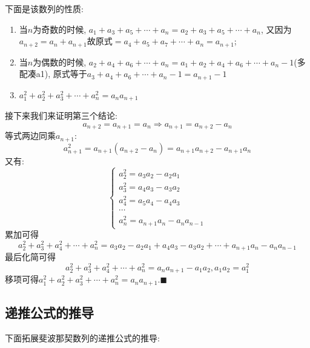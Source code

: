 \documentclass{book}
\begin{document}
    下面是该数列的性质:

    \begin{enumerate}
        \item 当$n$为奇数的时候, $a_1+a_3+a_5+\cdots+a_n=a_2+a_3+a_5+\cdots+a_n$, 又因为$a_{n+2}=a_n+a_{n+1}$故原式$=a_4+a_5+a_7+\cdots+a_n=a_{n+1}$;
        \item 当$n$为偶数的时候, $a_2+a_4+a_6+\cdots+a_n=a_1+a_2+a_4+a_6+\cdots+a_n-1$(多配凑a1), 原式等于$a_3+a_4+a_6+\cdots+a_n-1=a_{n+1}-1$
        \item $\displaystyle a_1^2+a_2^2+a_3^2+\cdots+a_n^2=a_na_{n+1}$
    \end{enumerate}

    接下来我们来证明第三个结论:
    $$a_{n+2}=a_{n+1}=a_n\Longrightarrow a_{n+1}=a_{n+2}-a_n$$
    等式两边同乘$a_{n+1}$:$$a_{n+1}^2=a_{n+1}\left( a_{n+2}-a_n \right)=a_{n+1}a_{n+2}-a_{n+1}a_n$$
    又有:$$\left\{\begin{matrix}
            a_2^2=a_3a_2-a_2a_1 \\
            a_3^2=a_4a_3-a_3a_2 \\
            a_4^2=a_5a_4-a_4a_3 \\
            \cdots              \\
            a_n^2=a_{n+1}a_n-a_{n}a_{n-1}
        \end{matrix}\right. $$
    累加可得$$a_2^2+a_3^2+a_4^2+\cdots+a_n^2=a_3a_2-a_2a_1+a_4a_3-a_3a_2+\cdots+a_{n+1}a_n-a_{n}a_{n-1}$$
    最后化简可得$$a_2^2+a_3^2+a_4^2+\cdots+a_n^2=a_na_{n+1}-a_1a_2,a_1a_2=a_1^2$$
    移项可得$\displaystyle a_1^2+a_2^2+a_3^2+\cdots+a_n^2=a_na_{n+1}. \blacksquare$

    \subsection{递推公式的推导}
    下面拓展斐波那契数列的递推公式的推导:
\end{document}
